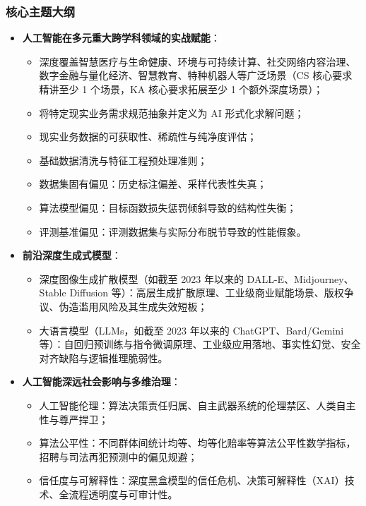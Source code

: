 \subsubsection{核心主题大纲}
\begin{itemize}
    \item \textbf{人工智能在多元重大跨学科领域的实战赋能}：
    \begin{itemize}
        \item 深度覆盖智慧医疗与生命健康、环境与可持续计算、社交网络内容治理、数字金融与量化经济、智慧教育、特种机器人等广泛场景（CS 核心要求精讲至少 1 个场景，KA 核心要求拓展至少 1 个额外深度场景）；
        \item 将特定现实业务需求规范抽象并定义为 AI 形式化求解问题；
        \item 现实业务数据的可获取性、稀疏性与纯净度评估；
        \item 基础数据清洗与特征工程预处理准则；
        \item 数据集固有偏见：历史标注偏差、采样代表性失真；
        \item 算法模型偏见：目标函数损失惩罚倾斜导致的结构性失衡；
        \item 评测基准偏见：评测数据集与实际分布脱节导致的性能假象。
    \end{itemize}
    \item \textbf{前沿深度生成式模型}：
    \begin{itemize}
        \item 深度图像生成扩散模型（如截至 2023 年以来的 DALL-E、Midjourney、Stable Diffusion 等）：高层生成扩散原理、工业级商业赋能场景、版权争议、伪造滥用风险及其生成失效短板；
        \item 大语言模型（LLMs，如截至 2023 年以来的 ChatGPT、Bard/Gemini 等）：自回归预训练与指令微调原理、工业级应用落地、事实性幻觉、安全对齐缺陷与逻辑推理脆弱性。
    \end{itemize}
    \item \textbf{人工智能深远社会影响与多维治理}：
    \begin{itemize}
        \item 人工智能伦理：算法决策责任归属、自主武器系统的伦理禁区、人类自主性与尊严捍卫；
        \item 算法公平性：不同群体间统计均等、均等化赔率等算法公平性数学指标，招聘与司法再犯预测中的偏见规避；
        \item 信任度与可解释性：深度黑盒模型的信任危机、决策可解释性（XAI）技术、全流程透明度与可审计性。
    \end{itemize}
\end{itemize}

